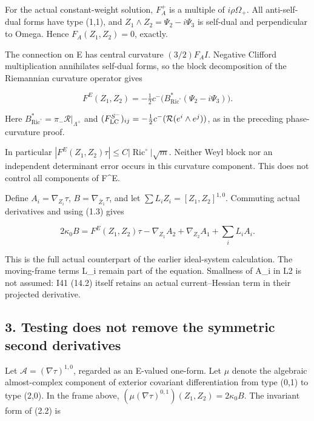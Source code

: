 \documentclass[
  10pt,
]{article}
\begin{document}
For the actual constant-weight solution, \(F_A^+\) is a multiple of
\(i\rho\Omega_+\). All anti-self-dual forms have type (1,1), and
\(Z_1\wedge Z_2=\Psi_2-i\Psi_3\) is self-dual and perpendicular to
Omega. Hence \(F_A(Z_1,Z_2)=0\), exactly.

The connection on E has central curvature \((3/2)F_A I\). Negative
Clifford multiplication annihilates self-dual forms, so the block
decomposition of the Riemannian curvature operator gives

\[
 \boxed{F^E(Z_1,Z_2)
   =-\tfrac12c^-\bigl(B_{\operatorname{Ric}^{\circ}}^*
                          (\Psi_2-i\Psi_3)\bigr).}       \tag{2.1}
\]

Here \(B_{\operatorname{Ric}^{\circ}}^*=\pi_-\mathcal R|_{\Lambda^+}\)
and \((F_{\rm LC}^{S^-})_{ij}=-\tfrac12c^-(\mathcal R(e^i\wedge e^j))\),
as in the preceding phase-curvature proof.

In particular
\(|F^E(Z_1,Z_2)\tau|\le C|\operatorname{Ric}^{\circ}|\sqrt m\). Neither
Weyl block nor an independent determinant error occurs in this curvature
component. This does not control all components of F\^{}E.

Define \(A_i=\nabla_{Z_i}\tau\), \(B=\nabla_{\overline Z_1}\tau\), and
let \(\sum L_iZ_i=[Z_1,Z_2]^{1,0}\). Commuting actual derivatives and
using (1.3) gives

\[
 \boxed{2\kappa_0 B=F^E(Z_1,Z_2)\tau
       -\nabla_{Z_1}A_2+\nabla_{Z_2}A_1+\sum_i L_iA_i.}   \tag{2.2}
\]

This is the full actual counterpart of the earlier ideal-system
calculation. The moving-frame terms L\_i remain part of the equation.
Smallness of A\_i in L2 is not assumed: I41 (14.2) itself retains an
actual current--Hessian term in their projected derivative.

\hypertarget{testing-does-not-remove-the-symmetric-second-derivatives}{%
\subsection{3. Testing does not remove the symmetric second
derivatives}\label{testing-does-not-remove-the-symmetric-second-derivatives}}

Let \(\mathcal A=(\nabla\tau)^{1,0}\), regarded as an E-valued one-form.
Let \(\mu\) denote the algebraic almost-complex component of exterior
covariant differentiation from type (0,1) to type (2,0). In the frame
above, \((\mu(\nabla\tau)^{0,1})(Z_1,Z_2)=2\kappa_0 B\). The invariant
form of (2.2) is
\end{document}
